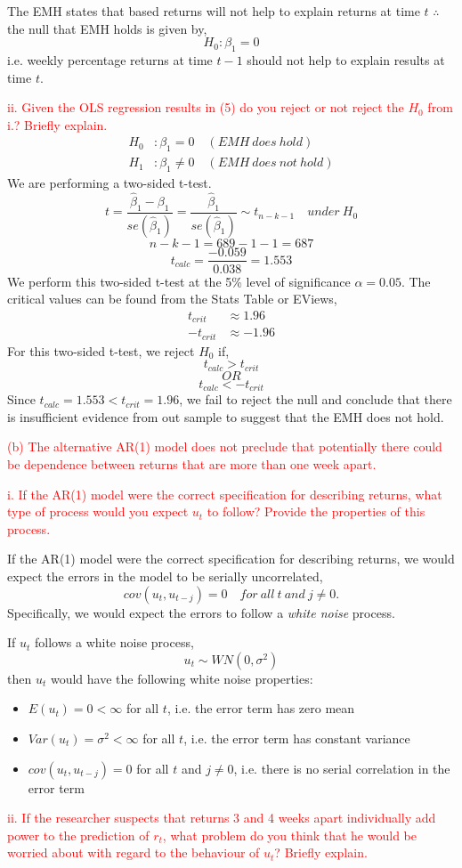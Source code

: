 \documentclass[12pt]{report}
\begin{document}
\noindent The EMH states that based returns will not help to explain returns at time $t$ $\therefore$ the null that EMH holds is given by, $$H_0: \beta_1 = 0$$ i.e. weekly percentage returns at time $t-1$ should not help to explain results at time $t$.

\noindent \textcolor{red}{ii. Given the OLS regression results in (5) do you reject or not reject the $H_0$ from i.? Briefly explain.}
\begin{align*}
	H_0&: \beta_1 = 0 \quad (EMH\ does\ hold) \\
	H_1&: \beta_1 \neq 0 \quad (EMH\ does\ not\ hold)
\end{align*} \noindent We are performing a two-sided t-test.
$$t = \dfrac{\hat{\beta}_1 - \beta_1}{se(\hat{\beta}_1)} = \dfrac{\hat{\beta}_1}{se(\hat{\beta}_1)} \sim t_{n-k-1} \quad under\ H_0$$
$$n-k-1 = 689 - 1 - 1 = 687$$
$$t_{calc} = \dfrac{-0.059}{0.038} = 1.553$$
\noindent We perform this two-sided t-test at the 5\% level of significance $\alpha = 0.05$. The critical values can be found from the Stats Table or EViews,
\begin{align*}
	t_{crit} &\approx 1.96 \\
	-t_{crit} &\approx -1.96 
\end{align*}
\noindent For this two-sided t-test, we reject $H_0$ if,
$$t_{calc} > t_{crit}$$ $$OR$$ $$t_{calc} < -t_{crit}$$
\noindent Since $t_{calc} = 1.553 < t_{crit} = 1.96$, we fail to reject the null and conclude that there is insufficient evidence from out sample to suggest that the EMH does not hold.

\noindent \textcolor{red}{(b) The alternative AR(1) model does not preclude that potentially there could be dependence between returns that are more than one week apart.}

\noindent \textcolor{red}{i. If the AR(1) model were the correct specification for describing returns, what type of process would you expect $u_t$ to follow? Provide the properties of this process.}

\noindent If the AR(1) model were the correct specification for describing returns, we would expect the errors in the model to be serially uncorrelated, $$cov(u_t, u_{t-j}) = 0 \quad for\ all\ t\ and\ j\neq0.$$ Specifically, we would expect the errors to follow a \textit{white noise} process.

\noindent If $u_t$ follows a white noise process, $$u_t \sim WN(0,\sigma^2)$$ then $u_t$ would have the following white noise properties:
\begin{itemize}
	\item $E(u_t) = 0 < \infty$ for all $t$, i.e. the error term has zero mean
	\item $Var(u_t) = \sigma^2 < \infty$ for all $t$, i.e. the error term has constant variance
	\item $cov(u_t, u_{t-j}) = 0$ for all $t$ and $j\neq0$, i.e. there is no serial correlation in the error term
\end{itemize}
\noindent \textcolor{red}{ii. If the researcher suspects that returns 3 and 4 weeks apart individually add power to the prediction of $r_t$, what problem do you think that he would be worried about with regard to the behaviour of $u_t$? Briefly explain.}
\end{document}
